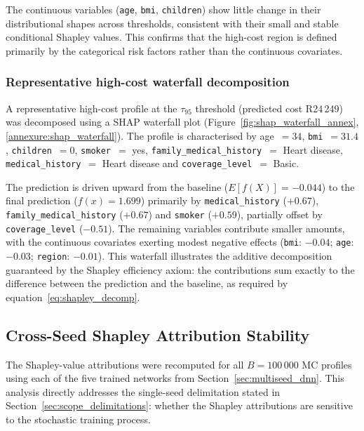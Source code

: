 \noindent
The continuous variables (\texttt{age}, \texttt{bmi},
\texttt{children}) show little change in their distributional shapes
across thresholds, consistent with their small and stable conditional
Shapley values. This confirms that the high-cost region is defined
primarily by the categorical risk factors rather than the continuous
covariates.

\subsubsection{Representative high-cost waterfall decomposition}

A representative high-cost profile at the $\tau_{95}$ threshold
(predicted cost R24\,249) was decomposed using a SHAP waterfall plot
(Figure~\ref{fig:shap_waterfall_annex},
\ref{annexure:shap_waterfall}).  The profile is characterised
by age~$= 34$, \texttt{bmi}~$= 31.4$, \texttt{children}~$= 0$,
\texttt{smoker}~$=$ yes, \texttt{family\_medical\_\allowbreak{}history}~$=$ Heart
disease, \texttt{medical\_\allowbreak{}history}~$=$ Heart disease and
\texttt{coverage\_\allowbreak{}level}~$=$ Basic.

The prediction is driven upward from the baseline
($E[f(X)] = -0.044$) to the final prediction ($f(x) = 1.699$)
primarily by \texttt{medical\_\allowbreak{}history} ($+0.67$),
\texttt{family\_medical\_\allowbreak{}history} ($+0.67$) and \texttt{smoker}
($+0.59$), partially offset by \texttt{coverage\_\allowbreak{}level} ($-0.51$).
The remaining variables contribute smaller amounts, with the continuous
covariates exerting modest negative effects (\texttt{bmi}: $-0.04$;
\texttt{age}: $-0.03$; \texttt{region}: $-0.01$).  This waterfall
illustrates the additive decomposition guaranteed by the Shapley
efficiency axiom: the contributions sum exactly to the difference
between the prediction and the baseline, as required by
equation~\eqref{eq:shapley_decomp}.


\subsection{Cross-Seed Shapley Attribution Stability}
\label{sec:cross_seed_shap}

The Shapley-value attributions were recomputed for all $B = 100\,000$
MC profiles using each of the five trained networks from
Section~\ref{sec:multiseed_dnn}.  This analysis directly addresses the
single-seed delimitation stated in
Section~\ref{sec:scope_delimitations}: whether the Shapley
attributions are sensitive to the stochastic training process.

